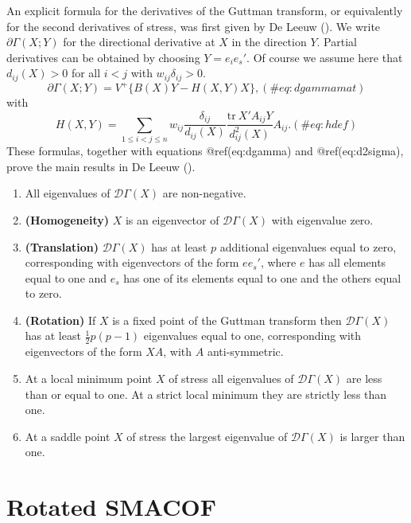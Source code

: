 \documentclass[
  12pt,
  letterpaper,
  DIV=11,
  numbers=noendperiod]{scrartcl}
\providecommand{\tightlist}{%
  \setlength{\itemsep}{0pt}\setlength{\parskip}{0pt}}
\begin{document}
An explicit formula for the derivatives of the Guttman transform, or
equivalently for the second derivatives of stress, was first given by De
Leeuw (). We write
\(\partial\Gamma(X;Y)\) for the directional derivative at \(X\) in the
direction \(Y\). Partial derivatives can be obtained by choosing
\(Y=e_ie_s'\). Of course we assume here that \(d_{ij}(X)>0\) for all
\(i<j\) with \(w_{ij}\delta_{ij}>0\). \begin{equation}
\partial\Gamma(X;Y)=V^+\{B(X)Y-H(X,Y)X\},
(\#eq:dgammamat)
\end{equation} with \begin{equation}
H(X,Y)=\mathop{\sum}_{1\leq i<j\leq n}w_{ij}\frac{\delta_{ij}}{d_{ij}(X)}\frac{\text{tr}\ X'A_{ij}Y}{d_{ij}^2(X)}A_{ij}.
(\#eq:hdef)
\end{equation} These formulas, together with equations @ref(eq:dgamma)
and @ref(eq:d2sigma), prove the main results in De Leeuw
().

\begin{enumerate}
\def\labelenumi{\arabic{enumi}.}
\tightlist
\item
  All eigenvalues of \(\mathcal{D}\Gamma(X)\) are non-negative.
\item
  \textbf{(Homogeneity)} \(X\) is an eigenvector of
  \(\mathcal{D}\Gamma(X)\) with eigenvalue zero.
\item
  \textbf{(Translation)} \(\mathcal{D}\Gamma(X)\) has at least \(p\)
  additional eigenvalues equal to zero, corresponding with eigenvectors
  of the form \(ee_s'\), where \(e\) has all elements equal to one and
  \(e_s\) has one of its elements equal to one and the others equal to
  zero.
\item
  \textbf{(Rotation)} If \(X\) is a fixed point of the Guttman transform
  then \(\mathcal{D}\Gamma(X)\) has at least \(\frac12 p(p-1)\)
  eigenvalues equal to one, corresponding with eigenvectors of the form
  \(XA\), with \(A\) anti-symmetric.
\item
  At a local minimum point \(X\) of stress all eigenvalues of
  \(\mathcal{D}\Gamma(X)\) are less than or equal to one. At a strict
  local minimum they are strictly less than one.
\item
  At a saddle point \(X\) of stress the largest eigenvalue of
  \(\mathcal{D}\Gamma(X)\) is larger than one.
\end{enumerate}

\section{Rotated SMACOF}\label{rotated-smacof}
\end{document}
